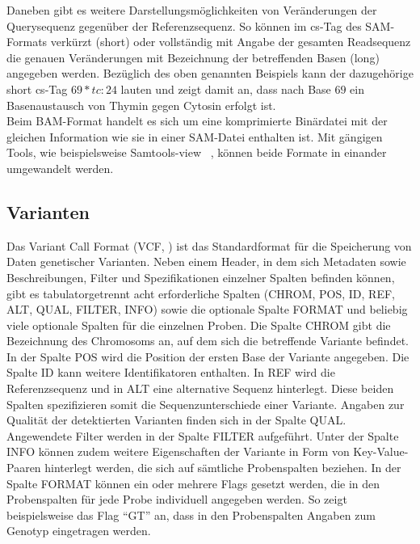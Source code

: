 Daneben gibt es weitere Darstellungsmöglichkeiten von Veränderungen der Querysequenz gegenüber der Referenzsequenz. So können im cs-Tag des SAM-Formats verkürzt (short) oder vollständig mit Angabe der gesamten Readsequenz die genauen Veränderungen mit Bezeichnung der betreffenden Basen (long) angegeben werden. Bezüglich des oben genannten Beispiels kann der dazugehörige short cs-Tag $ 69*tc:24 $ lauten und zeigt damit an, dass nach Base $69$ ein Basenaustausch von Thymin gegen Cytosin erfolgt ist.\\

Beim BAM-Format handelt es sich um eine komprimierte Binärdatei \cite{sam_bam} mit der gleichen Information wie sie in einer SAM-Datei enthalten ist. Mit gängigen Tools, wie beispielsweise Samtools-view ~\cite{li_2009}, können beide Formate in einander umgewandelt werden.

\subsection{Varianten} \label{subsec:vcformat}
Das Variant Call Format (VCF, \cite{danecek_2011}) ist das Standardformat für die Speicherung von Daten genetischer Varianten. Neben einem Header, in dem sich Metadaten sowie Beschreibungen, Filter und Spezifikationen einzelner Spalten befinden können, gibt es tabulatorgetrennt acht erforderliche  Spalten (CHROM, POS, ID, REF, ALT, QUAL, FILTER, INFO) sowie die optionale Spalte FORMAT und beliebig viele optionale Spalten für die einzelnen Proben. Die Spalte CHROM gibt die Bezeichnung des Chromosoms an, auf dem sich die betreffende Variante befindet. In der Spalte POS wird die Position der ersten Base der Variante angegeben. Die Spalte ID kann weitere Identifikatoren enthalten. In REF wird die Referenzsequenz und in ALT eine alternative Sequenz hinterlegt. Diese beiden Spalten spezifizieren somit die Sequenzunterschiede einer Variante. Angaben zur Qualität der detektierten Varianten finden sich in der Spalte QUAL. Angewendete Filter werden in der Spalte FILTER aufgeführt. Unter der Spalte INFO können zudem weitere Eigenschaften der Variante in Form von Key-Value-Paaren hinterlegt werden, die sich auf sämtliche Probenspalten beziehen. In der Spalte FORMAT können ein oder mehrere Flags gesetzt werden, die in den Probenspalten für jede Probe individuell angegeben werden. So zeigt beispielsweise das Flag ``GT'' an, dass in den Probenspalten Angaben zum Genotyp eingetragen werden.
\let\cleardoublepage\clearpage